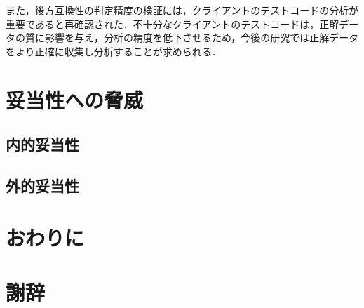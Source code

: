 \documentclass[11pt,dvipdfmx]{jreport}
\begin{document}
また，後方互換性の判定精度の検証には，クライアントのテストコードの分析が重要であると再確認された．不十分なクライアントのテストコードは，正解データの質に影響を与え，分析の精度を低下させるため，今後の研究では正解データをより正確に収集し分析することが求められる．


\chapter{妥当性への脅威}

\section{内的妥当性}

\section{外的妥当性}

\chapter{おわりに}

\chapter*{謝辞}











% 
% 
% 

\end{document}
